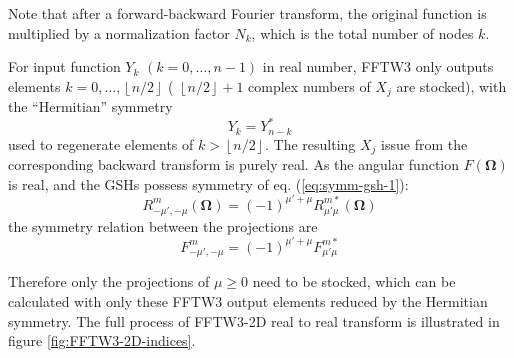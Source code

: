 Note that after a forward-backward Fourier transform, the original
function is multiplied by a normalization factor $N_{k}$, which is
the total number of nodes $k$.

For input function $Y_{k}$ $(k=0,\ldots,n-1)$ in real number, FFTW3
only outputs elements $k=0,\ldots,\left\lfloor n/2\right\rfloor $
( $\left\lfloor n/2\right\rfloor +1$ complex numbers of $X_{j}$
are stocked), with the “Hermitian” symmetry
\begin{equation}
Y_{k}=Y_{n-k}^{*}\label{eq:yk_conjg}
\end{equation}
used to regenerate elements of $k>\left\lfloor n/2\right\rfloor $.
The resulting $X_{j}$ issue from the corresponding backward transform
is purely real. As the angular function $F(\mathbf{\Omega})$ is real,
and the \acs{GSH}s possess symmetry of eq. (\ref{eq:symm-gsh-1}):
\begin{equation}
R_{-\mu',-\mu}^{m}(\mathbf{\Omega})=\left(-1\right)^{\mu'+\mu}R_{\mu'\mu}^{m*}(\mathbf{\Omega})
\end{equation}
the symmetry relation between the projections are
\begin{equation}
F_{-\mu',-\mu}^{m}=\left(-1\right)^{\mu'+\mu}F_{\mu'\mu}^{m*}\label{eq:symm_f_m_mup_mu}
\end{equation}

Therefore only the projections of $\mu\geq0$ need to be stocked,
which can be calculated with only these FFTW3 output elements reduced
by the Hermitian symmetry. The full process of FFTW3-2D real to real
transform is illustrated in figure \ref{fig:FFTW3-2D-indices}.


